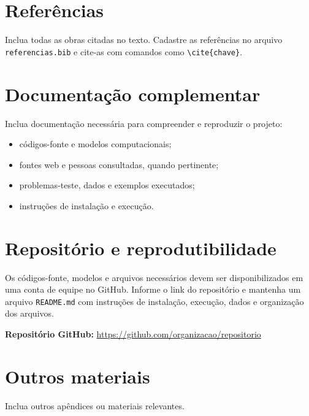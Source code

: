 \documentclass[12pt,a4paper]{article}
\begin{document}
\section{Referências}
Inclua todas as obras citadas no texto. Cadastre as referências no arquivo \texttt{referencias.bib} e cite-as com comandos como \texttt{\textbackslash cite\{chave\}}.


\appendix
\section{Documentação complementar}
Inclua documentação necessária para compreender e reproduzir o projeto:
\begin{itemize}[leftmargin=*]
    \item códigos-fonte e modelos computacionais;
    \item fontes web e pessoas consultadas, quando pertinente;
    \item problemas-teste, dados e exemplos executados;
    \item instruções de instalação e execução.
\end{itemize}

\section{Repositório e reprodutibilidade}
Os códigos-fonte, modelos e arquivos necessários devem ser disponibilizados em uma conta de equipe no GitHub. Informe o link do repositório e mantenha um arquivo \texttt{README.md} com instruções de instalação, execução, dados e organização dos arquivos.

\noindent\textbf{Repositório GitHub:} \url{https://github.com/organizacao/repositorio}

\section{Outros materiais}
Inclua outros apêndices ou materiais relevantes.
\end{document}
